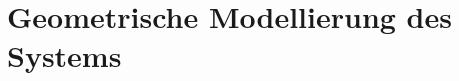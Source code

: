 \documentclass[Bachelor, BMR, ngerman]{twbook}
\begin{document}
\begin{table}[H]
\begin{tabular}{| p{5.7cm} | C{4.5cm} | C{4.5cm} |}
            \end{tabular}
    \end{table}
    \noindent



\newpage
\chapter{Geometrische Modellierung des Systems}
\label{cap:geometrische-modellierung}
\end{document}
